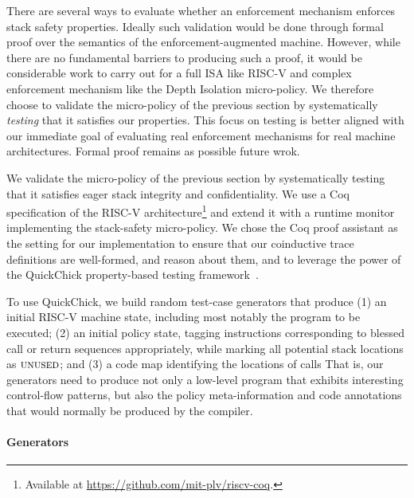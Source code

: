 \documentclass[acmsmall,review,anonymous]{acmart}\settopmatter{printfolios=true,printccs=false,printacmref=false}
\begin{document}
{There are several ways to evaluate whether an enforcement mechanism enforces
stack safety properties. Ideally such validation would be done through formal proof over
the semantics of the enforcement-augmented machine.
However, while there are no fundamental barriers to producing such a proof,
it would be considerable work to carry out for a full ISA like RISC-V and
complex enforcement mechanism like the Depth Isolation micro-policy.
We therefore choose to validate the micro-policy of the previous section by
systematically \emph{testing} that it satisfies our properties.
This focus on testing is better aligned with our immediate
goal of evaluating real enforcement mechanisms for real machine architectures.
Formal proof remains as possible future wrok.

We validate the micro-policy of the previous section by
systematically testing that it satisfies eager stack integrity and
confidentiality. We use a Coq specification of the RISC-V
architecture\footnote{Available at \url{https://github.com/mit-plv/riscv-coq}.}
and extend it with a
runtime monitor implementing the stack-safety
micro-policy. We
  chose the Coq proof assistant as the setting for our implementation
  to ensure that our coinductive trace
  definitions are well-formed, and reason about them, and to leverage the power of the
  QuickChick property-based testing framework~\citep{Pierce:SF4}.

To use QuickChick, we build random test-case generators that produce
(1) an initial RISC-V machine state, including most notably
  the program to be executed;
(2)
  an initial policy state, tagging instructions corresponding to
  blessed call or return sequences appropriately, while marking
  all potential stack locations as $\textsc{unused}$; and
(3)
 a code map identifying the locations of calls
%
That is, our generators need to produce not only a low-level program
that exhibits interesting control-flow patterns, but also the policy
meta-information and code annotations that would normally be produced
by the compiler.

\paragraph*{Generators}

}
\end{document}
